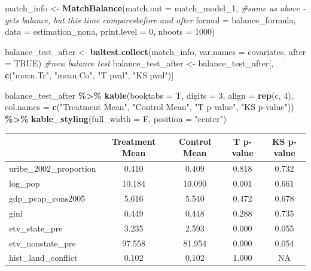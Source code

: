 \documentclass[
]{article}
\newenvironment{Shaded}{\begin{snugshade}}{\end{snugshade}}
\newcommand{\AttributeTok}[1]{\textcolor[rgb]{0.13,0.29,0.53}{#1}}
\newcommand{\CommentTok}[1]{\textcolor[rgb]{0.56,0.35,0.01}{\textit{#1}}}
\newcommand{\ConstantTok}[1]{\textcolor[rgb]{0.56,0.35,0.01}{#1}}
\newcommand{\DecValTok}[1]{\textcolor[rgb]{0.00,0.00,0.81}{#1}}
\newcommand{\FunctionTok}[1]{\textcolor[rgb]{0.13,0.29,0.53}{\textbf{#1}}}
\newcommand{\NormalTok}[1]{#1}
\newcommand{\OtherTok}[1]{\textcolor[rgb]{0.56,0.35,0.01}{#1}}
\newcommand{\SpecialCharTok}[1]{\textcolor[rgb]{0.81,0.36,0.00}{\textbf{#1}}}
\newcommand{\StringTok}[1]{\textcolor[rgb]{0.31,0.60,0.02}{#1}}
\begin{document}
\begin{Shaded}
\begin{Highlighting}[]
\NormalTok{match\_info }\OtherTok{\textless{}{-}} \FunctionTok{MatchBalance}\NormalTok{(}\AttributeTok{match.out =}\NormalTok{ match\_model\_1, }\CommentTok{\#same as above {-} gets balance, but this time comparesbefore and after}
                                    \AttributeTok{formul =}\NormalTok{ balance\_formula,}
                                    \AttributeTok{data =}\NormalTok{ estimation\_nona,}
                                    \AttributeTok{print.level =} \DecValTok{0}\NormalTok{, }\AttributeTok{nboots =} \DecValTok{1000}\NormalTok{)}

\NormalTok{balance\_test\_after }\OtherTok{\textless{}{-}} \FunctionTok{baltest.collect}\NormalTok{(match\_info, }\AttributeTok{var.names =}\NormalTok{ covariates, }\AttributeTok{after =} \ConstantTok{TRUE}\NormalTok{) }\CommentTok{\#new balance test}
\NormalTok{balance\_test\_after }\OtherTok{\textless{}{-}}\NormalTok{ balance\_test\_after[, }\FunctionTok{c}\NormalTok{(}\StringTok{"mean.Tr"}\NormalTok{, }\StringTok{"mean.Co"}\NormalTok{, }\StringTok{"T pval"}\NormalTok{, }\StringTok{"KS pval"}\NormalTok{)]}

\NormalTok{balance\_test\_after }\SpecialCharTok{\%\textgreater{}\%}
  \FunctionTok{kable}\NormalTok{(}\AttributeTok{booktabs =}\NormalTok{ T, }\AttributeTok{digits =} \DecValTok{3}\NormalTok{, }\AttributeTok{align =} \FunctionTok{rep}\NormalTok{(}\StringTok{\textquotesingle{}c\textquotesingle{}}\NormalTok{, }\DecValTok{4}\NormalTok{),}
        \AttributeTok{col.names =} \FunctionTok{c}\NormalTok{(}\StringTok{"Treatment Mean"}\NormalTok{, }\StringTok{"Control Mean"}\NormalTok{, }\StringTok{"T p{-}value"}\NormalTok{, }\StringTok{"KS p{-}value"}\NormalTok{)) }\SpecialCharTok{\%\textgreater{}\%} 
  \FunctionTok{kable\_styling}\NormalTok{(}\AttributeTok{full\_width =}\NormalTok{ F, }\AttributeTok{position =} \StringTok{"center"}\NormalTok{)}
\end{Highlighting}
\end{Shaded}

\begin{longtable}[t]{lcccc}
\toprule
 & Treatment Mean & Control Mean & T p-value & KS p-value\\
\midrule
uribe\_2002\_proportion & 0.410 & 0.409 & 0.818 & 0.732\\
log\_pop & 10.184 & 10.090 & 0.001 & 0.661\\
gdp\_pcap\_cons2005 & 5.616 & 5.540 & 0.472 & 0.678\\
gini & 0.449 & 0.448 & 0.288 & 0.735\\
etv\_state\_pre & 3.235 & 2.593 & 0.000 & 0.055\\
\addlinespace
etv\_nonstate\_pre & 97.558 & 81.954 & 0.000 & 0.054\\
hist\_land\_conflict & 0.102 & 0.102 & 1.000 & NA\\
\bottomrule
\end{longtable}
\end{document}
